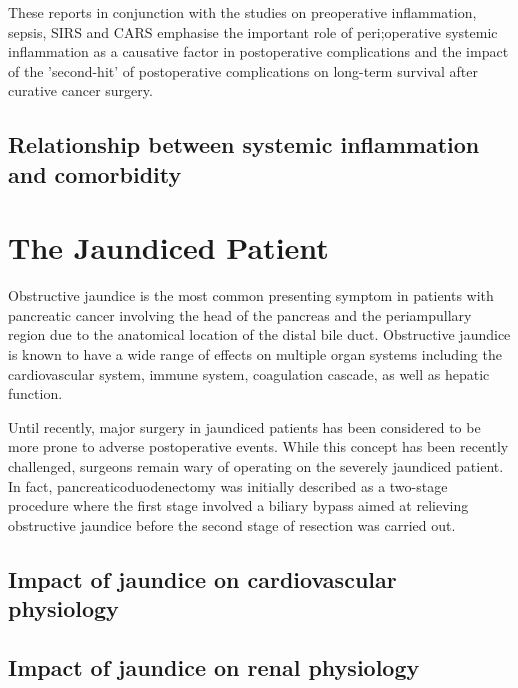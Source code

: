 These reports in conjunction with the studies on preoperative inflammation, sepsis, SIRS and CARS emphasise the important role of peri;operative systemic inflammation as a causative factor in postoperative complications and the impact of the 'second-hit' of postoperative complications on long-term survival after curative cancer surgery.

\subsection{Relationship between systemic inflammation and comorbidity}


\section{The Jaundiced Patient}
Obstructive jaundice is the most common presenting symptom in patients with pancreatic cancer involving the head of the pancreas and the periampullary region due to the anatomical location of the distal bile duct. Obstructive jaundice is known to have a wide range of effects on multiple organ systems including the cardiovascular system, immune system, coagulation cascade, as well as hepatic function.

Until recently, major surgery in jaundiced patients has been considered to be more prone to adverse postoperative events. While this concept has been recently challenged, surgeons remain wary of operating on the severely jaundiced patient. In fact, pancreaticoduodenectomy was initially described as a two-stage procedure where the first stage involved a biliary bypass aimed at relieving obstructive jaundice before the second stage of resection was carried out.


\subsection{Impact of jaundice on cardiovascular physiology}

\subsection{Impact of jaundice on renal physiology}

